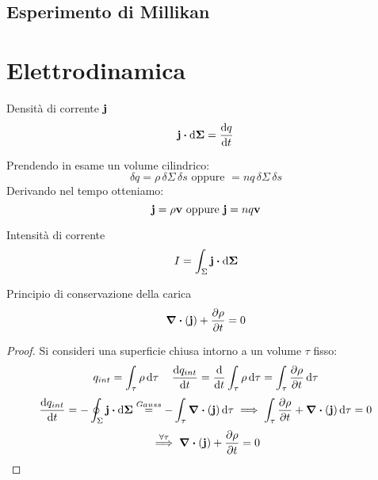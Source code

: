 \documentclass[12pt,a4paper]{article}
\begin{document}
\subsection{Esperimento di Millikan}






\section{Elettrodinamica}

\begin{definition}
    Densità di corrente $\vb{j}$
    \begin{equation*}
        \vb{j}\vdot\dd{\vb{\Sigma}}= \dv{q}{t}
    \end{equation*}
\end{definition}
Prendendo in esame un volume cilindrico:
\begin{equation*}
    \delta q = \rho\,\delta\Sigma\,\delta s \text{  oppure  } =  n q \,\delta\Sigma\,\delta s
\end{equation*}
Derivando nel tempo otteniamo:
\begin{equation*}
    \vb{j}= \rho\vb{v} \text{  oppure  } \vb{j}= nq\vb{v}
\end{equation*}
\begin{definition}
    Intensità di corrente
    \begin{equation*}
        I = \int_\Sigma \vb{j}\vdot\dd{\vb{\Sigma}}
    \end{equation*}
\end{definition}

\begin{theorem}
    Principio di conservazione della carica
    \begin{equation*}
        \div(\vb{j})+\pdv{\rho}{t}=0
    \end{equation*}
\end{theorem}
\begin{proof}
    Si consideri una superficie chiusa intorno a un volume $\tau$ fisso:
    \begin{equation*}
        q_{int}= \int_\tau\rho\dd{\tau} \quad \dv{q_{int}}{t}= \dv{}{t}\int_\tau \rho\dd{\tau} = \int_\tau \pdv{\rho}{t}\dd{\tau}
    \end{equation*}
    \begin{equation*}
        \dv{q_{int}}{t}= - \oint_\Sigma \vb{j}\vdot\dd{\vb{\Sigma}}\overset{Gauss}{=}-\int_\tau \div(\vb{j})\dd{\tau}\implies
        \int_\tau \pdv{\rho}{t} + \div(\vb{j}) \dd{\tau}= 0
    \end{equation*}
    \begin{equation*}
        \overset{\forall\tau}{\implies} \div(\vb{j})+ \pdv{\rho}{t}=0
    \end{equation*}

\end{proof}
\end{document}
